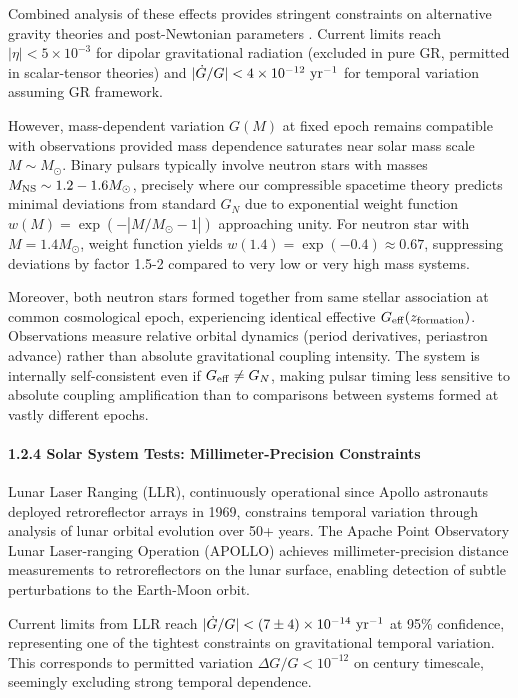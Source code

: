 \documentclass[11pt,a4paper]{article}
\begin{document}
Combined analysis of these effects provides stringent constraints on
alternative gravity theories and post-Newtonian parameters \cite{Will2014}. Current
limits reach \(|\eta| < 5 \times 10^{-3}\) for dipolar gravitational
radiation (excluded in pure GR, permitted in scalar-tensor theories) and
\(|\dot{G}/G| < 4 \times 10^{-12}~{\rm yr^{-1}}\) for temporal variation
assuming GR framework.

However, mass-dependent variation \(G(M)\) at fixed epoch remains
compatible with observations provided mass dependence saturates near
solar mass scale \(M \sim M_\odot\). Binary pulsars typically involve
neutron stars with masses \(M_{\rm NS} \sim 1.2-1.6 M_\odot\), precisely
where our compressible spacetime theory predicts minimal deviations from
standard \(G_N\) due to exponential weight function
\(w(M) = \exp(-|M/M_\odot - 1|)\) approaching unity. For neutron star
with \(M = 1.4 M_\odot\), weight function yields
\(w(1.4) = \exp(-0.4) \approx 0.67\), suppressing deviations by factor
1.5-2 compared to very low or very high mass systems.

Moreover, both neutron stars formed together from same stellar
association at common cosmological epoch, experiencing identical
effective \(G_{\rm eff}(z_{\rm formation})\). Observations measure
relative orbital dynamics (period derivatives, periastron advance)
rather than absolute gravitational coupling intensity. The system is
internally self-consistent even if \(G_{\rm eff} \neq G_N\), making
pulsar timing less sensitive to absolute coupling amplification than to
comparisons between systems formed at vastly different epochs.

\hypertarget{solar-system-tests-millimeter-precision-constraints}{%
\paragraph{1.2.4 Solar System Tests: Millimeter-Precision
Constraints}\label{solar-system-tests-millimeter-precision-constraints}}

Lunar Laser Ranging (LLR), continuously operational since Apollo
astronauts deployed retroreflector arrays in 1969, constrains temporal
variation through analysis of lunar orbital evolution over 50+ years.
The Apache Point Observatory Lunar Laser-ranging Operation (APOLLO)
achieves millimeter-precision distance measurements to retroreflectors
on the lunar surface, enabling detection of subtle perturbations to the
Earth-Moon orbit.

Current limits from LLR reach
\(|\dot{G}/G| < (7 \pm 4) \times 10^{-14}~{\rm yr^{-1}}\) at 95\%
confidence, representing one of the tightest constraints on
gravitational temporal variation. This corresponds to permitted
variation \(\Delta G/G < 10^{-12}\) on century timescale, seemingly
excluding strong temporal dependence.
\end{document}

